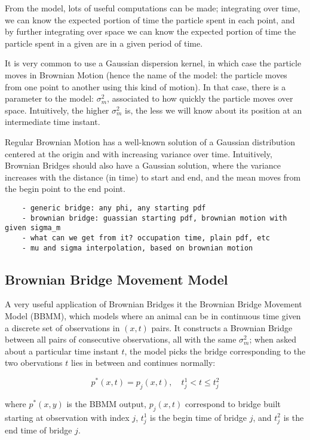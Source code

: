 \documentclass{article}
\begin{document}
From the model, lots of useful computations can be made; integrating over time, we can know the expected portion of time the particle spent in each point, and by further integrating over space we can know the expected portion of time the particle spent in a given are in a given period of time.

It is very common to use a Gaussian dispersion kernel, in which case the particle moves in Brownian Motion (hence the name of the model: the particle moves from one point to another using this kind of motion). In that case, there is a parameter to the model: $\sigma_m^2$, associated to how quickly the particle moves over space. Intuitively, the higher $\sigma_m^2$ is, the less we will know about its position at an intermediate time instant.

Regular Brownian Motion has a well-known solution of a Gaussian distribution centered at the origin and with increasing variance over time. Intuitively, Brownian Bridges should also have a Gaussian solution, where the variance increases with the distance (in time) to start and end, and the mean moves from the begin point to the end point.


\begin{verbatim}
    - generic bridge: any phi, any starting pdf
    - brownian bridge: guassian starting pdf, brownian motion with given sigma_m
    - what can we get from it? occupation time, plain pdf, etc
    - mu and sigma interpolation, based on brownian motion
\end{verbatim}

\subsection{Brownian Bridge Movement Model}

A very useful application of Brownian Bridges it the Brownian Bridge Movement Model (BBMM), which models where an animal can be in continuous time given a discrete set of observations in $(x,t)$ pairs. It constructs a Brownian Bridge between all pairs of consecutive observations, all with the same $\sigma_m^2$; when asked about a particular time instant $t$, the model picks the bridge corresponding to the two obervations $t$ lies in between and continues normally:

\[ p^*(x,t) = p_j(x,t), \quad t_j^1 < t \leq t_j^2 \]

where $p^*(x,y)$ is the BBMM output, $p_j(x,t)$ correspond to bridge built starting at observation with index $j$, $t_j^1$ is the begin time of bridge $j$, and $t_j^2$ is the end time of bridge $j$.
\end{document}
